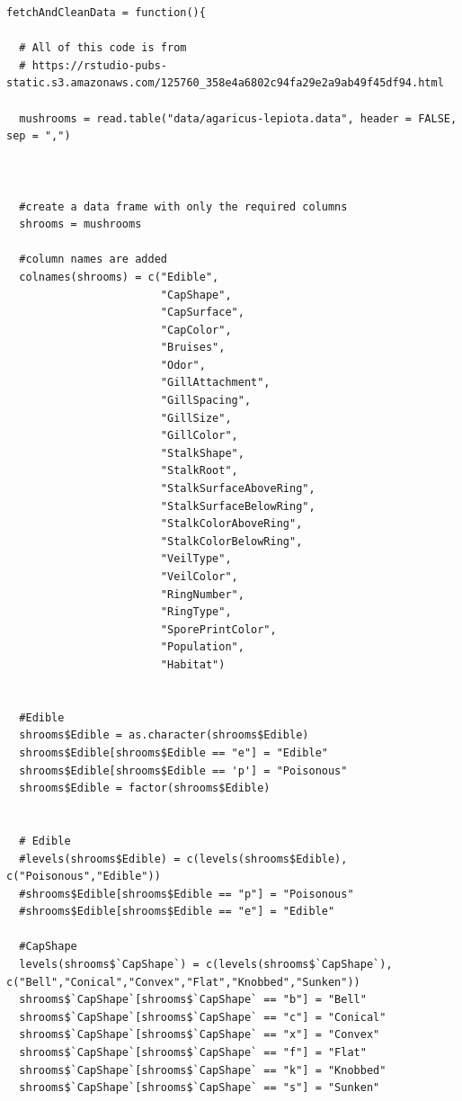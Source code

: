 \documentclass[10pt  ,usenames, dvipsnames]{article}\usepackage[]{graphicx}\usepackage[]{color}
\begin{document}
    \begin{lstlisting}
fetchAndCleanData = function(){
  
  # All of this code is from
  # https://rstudio-pubs-static.s3.amazonaws.com/125760_358e4a6802c94fa29e2a9ab49f45df94.html
  
  mushrooms = read.table("data/agaricus-lepiota.data", header = FALSE, sep = ",")
  
  
  
  #create a data frame with only the required columns
  shrooms = mushrooms
  
  #column names are added
  colnames(shrooms) = c("Edible",
                        "CapShape",
                        "CapSurface",
                        "CapColor",
                        "Bruises",                        
                        "Odor",
                        "GillAttachment",
                        "GillSpacing",
                        "GillSize",
                        "GillColor",
                        "StalkShape",
                        "StalkRoot",
                        "StalkSurfaceAboveRing",
                        "StalkSurfaceBelowRing",
                        "StalkColorAboveRing",
                        "StalkColorBelowRing",
                        "VeilType",
                        "VeilColor",
                        "RingNumber",
                        "RingType",
                        "SporePrintColor",
                        "Population",
                        "Habitat")
  
  
  #Edible
  shrooms$Edible = as.character(shrooms$Edible)
  shrooms$Edible[shrooms$Edible == "e"] = "Edible"
  shrooms$Edible[shrooms$Edible == 'p'] = "Poisonous"
  shrooms$Edible = factor(shrooms$Edible)
  
  
  # Edible
  #levels(shrooms$Edible) = c(levels(shrooms$Edible), c("Poisonous","Edible"))
  #shrooms$Edible[shrooms$Edible == "p"] = "Poisonous"
  #shrooms$Edible[shrooms$Edible == "e"] = "Edible"
  
  #CapShape
  levels(shrooms$`CapShape`) = c(levels(shrooms$`CapShape`), c("Bell","Conical","Convex","Flat","Knobbed","Sunken"))
  shrooms$`CapShape`[shrooms$`CapShape` == "b"] = "Bell"
  shrooms$`CapShape`[shrooms$`CapShape` == "c"] = "Conical"
  shrooms$`CapShape`[shrooms$`CapShape` == "x"] = "Convex"
  shrooms$`CapShape`[shrooms$`CapShape` == "f"] = "Flat"
  shrooms$`CapShape`[shrooms$`CapShape` == "k"] = "Knobbed"
  shrooms$`CapShape`[shrooms$`CapShape` == "s"] = "Sunken"
  

\end{lstlisting}
\end{document}
